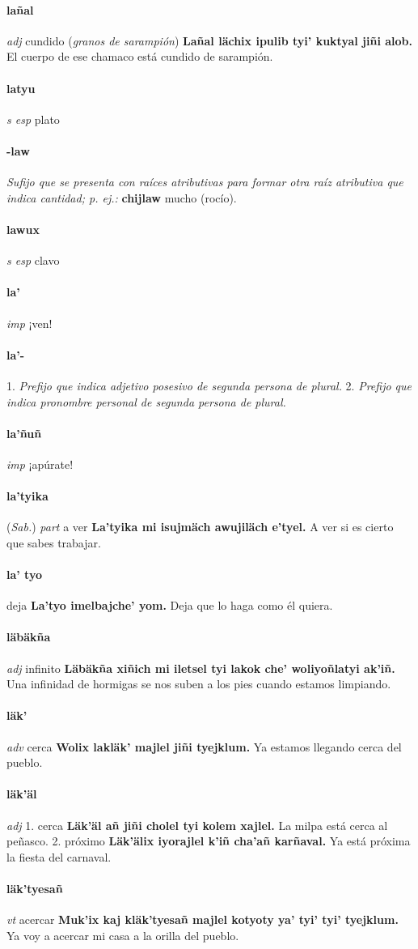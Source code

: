 \documentclass{scrbook}
\newcommand{\entry}[1]{\paragraph{#1}}
\newcommand{\onedefinition}[1]{#1.}
\newcommand{\nontranslationdef}[1]{\textit{#1}}
\newcommand{\partofspeech}[1]{\textit{#1}}
\newcommand{\spanishtranslation}[1]{#1}
\newcommand{\clarification}[1]{(\textit{#1})}
\newcommand{\cholexample}[1]{\textbf{#1}}
\newcommand{\exampletranslation}[1]{#1}
\newcommand{\relevantdialect}[1]{(\textit{#1})}
\begin{document}
\begin{multicols}{2}
\entry{lañal}
\partofspeech{adj}
\spanishtranslation{cundido}
\clarification{granos de sarampión}
\cholexample{Lañal lächix ipulib tyi' kuktyal jiñi alob.}
\exampletranslation{El cuerpo de ese chamaco está cundido de sarampión.}

\entry{latyu}
\partofspeech{s esp}
\spanishtranslation{plato}

\entry{-law}
\nontranslationdef{Sufijo que se presenta con raíces atributivas para formar otra raíz atributiva que indica cantidad; p. ej.:}
\cholexample{chijlaw}
\exampletranslation{mucho (rocío).}

\entry{lawux}
\partofspeech{s esp}
\spanishtranslation{clavo}

\entry{la'}
\partofspeech{imp}
\spanishtranslation{¡ven!}

\entry{la'-}
\onedefinition{1}
\nontranslationdef{Prefijo que indica adjetivo posesivo de segunda persona de plural.}
\onedefinition{2}
\nontranslationdef{Prefijo que indica pronombre personal de segunda persona de plural.}

\entry{la'ñuñ}
\partofspeech{imp}
\spanishtranslation{¡apúrate!}

\entry{la'tyika}
\relevantdialect{Sab.}
\partofspeech{part}
\spanishtranslation{a ver}
\cholexample{La'tyika mi isujmäch awujiläch e'tyel.}
\exampletranslation{A ver si es cierto que sabes trabajar.}

\entry{la' tyo}
\spanishtranslation{deja}
\cholexample{La'tyo imelbajche' yom.}
\exampletranslation{Deja que lo haga como él quiera.}

\entry{läbäkña}
\partofspeech{adj}
\spanishtranslation{infinito}
\cholexample{Läbäkña xiñich mi iletsel tyi lakok che' woliyoñlatyi ak'iñ.}
\exampletranslation{Una infinidad de hormigas se nos suben a los pies cuando estamos limpiando.}

\entry{läk'}
\partofspeech{adv}
\spanishtranslation{cerca}
\cholexample{Wolix lakläk' majlel jiñi tyejklum.}
\exampletranslation{Ya estamos llegando cerca del pueblo.}

\entry{läk'äl}
\partofspeech{adj}
\onedefinition{1}
\spanishtranslation{cerca}
\cholexample{Läk'äl añ jiñi cholel tyi kolem xajlel.}
\exampletranslation{La milpa está cerca al peñasco.}
\onedefinition{2}
\spanishtranslation{próximo}
\cholexample{Läk'älix iyorajlel k'iñ cha'añ karñaval.}
\exampletranslation{Ya está próxima la fiesta del carnaval.}

\entry{läk'tyesañ}
\partofspeech{vt}
\spanishtranslation{acercar}
\cholexample{Muk'ix kaj kläk'tyesañ majlel kotyoty ya' tyi' tyi' tyejklum.}
\exampletranslation{Ya voy a acercar mi casa a la orilla del pueblo.}


\end{multicols}
\end{document}
